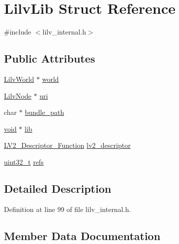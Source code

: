 \hypertarget{struct_lilv_lib}{}\section{Lilv\+Lib Struct Reference}
\label{struct_lilv_lib}


{\ttfamily \#include $<$lilv\+\_\+internal.\+h$>$}

\subsection*{Public Attributes}
\begin{DoxyCompactItemize}
\item 
\hyperlink{lilv_8h_a91c1745aa6ffca2b6b87c56df6c5ab86}{Lilv\+World} $\ast$ \hyperlink{struct_lilv_lib_a810957c6981e9beb5ed66e0384c55bf4}{world}
\item 
\hyperlink{lilv_8h_ae183dca3dca5368d34dbd863a405437b}{Lilv\+Node} $\ast$ \hyperlink{struct_lilv_lib_a491727e8f3a37f363df865b3747dca0f}{uri}
\item 
char $\ast$ \hyperlink{struct_lilv_lib_a0d4207243f3aeb738501d9f85133d666}{bundle\+\_\+path}
\item 
\hyperlink{sound_8c_ae35f5844602719cf66324f4de2a658b3}{void} $\ast$ \hyperlink{struct_lilv_lib_ad87f8e93c0aceedecb199f2a6e0f779b}{lib}
\item 
\hyperlink{lv2_8h_a798145fb1c82725b27ae5b469ff5be2d}{L\+V2\+\_\+\+Descriptor\+\_\+\+Function} \hyperlink{struct_lilv_lib_a1c690d70bc1e9d157a79ceb92d0f0e62}{lv2\+\_\+descriptor}
\item 
\hyperlink{lib-src_2ffmpeg_2win32_2stdint_8h_a6eb1e68cc391dd753bc8ce896dbb8315}{uint32\+\_\+t} \hyperlink{struct_lilv_lib_ad7001012df0c130733ed9e687d33166a}{refs}
\end{DoxyCompactItemize}


\subsection{Detailed Description}


Definition at line 99 of file lilv\+\_\+internal.\+h.



\subsection{Member Data Documentation}
